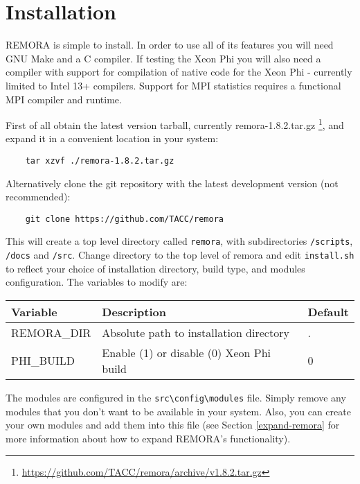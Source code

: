 \documentclass[10pt,a4paper]{report}
\begin{document}
\chapter{Installation}
REMORA is simple to install. In order to use all of its features you will need GNU Make and a C compiler. If testing the Xeon Phi you will also need a compiler with support for compilation of native code for the Xeon Phi - currently limited to Intel 13+ compilers. Support for MPI statistics requires a functional MPI compiler and runtime.

First of all obtain the latest version tarball, currently remora-1.8.2.tar.gz \footnote{\href{https://github.com/TACC/remora/archive/v1.8.2.tar.gz}{https://github.com/TACC/remora/archive/v1.8.2.tar.gz}}, and expand it in a convenient location in your system:

\begin{verbatim}
    tar xzvf ./remora-1.8.2.tar.gz
\end{verbatim}

Alternatively clone the git repository with the latest development version (not recommended):

\begin{verbatim}
    git clone https://github.com/TACC/remora
\end{verbatim}

This will create a top level directory called \verb+remora+, with subdirectories \verb+/scripts+, \verb+/docs+ and \verb+/src+. Change directory to the top level of remora and edit \verb+install.sh+ to reflect your choice of installation directory, build type, and modules configuration. The variables to modify are:

\begin{table}[h]
\centering
\label{tab:env}
\begin{tabular}{|l|l|l|}
\hline
\bf{Variable}	& \bf{Description}                          & \bf{Default}\\\hline
REMORA\_DIR     & Absolute path to installation directory   & . \\\hline
PHI\_BUILD      & Enable (1) or disable (0) Xeon Phi build  & 0 \\\hline
\end{tabular}
\end{table}

The modules are configured in the \verb+src\config\modules+ file. Simply remove any modules that you don't want to be available in your system. Also, you can create your own modules and add them into this file (see Section \ref{expand-remora} for more information about how to expand REMORA's functionality).
\end{document}
